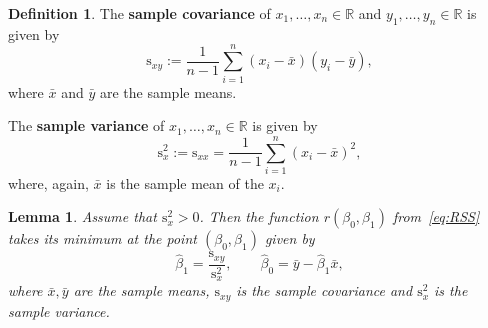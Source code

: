 \documentclass[
  a4paper,
]{article}
\newtheorem{lemma}{Lemma}[section]
\theoremstyle{definition}
\newtheorem{definition}{Definition}[section]
\theoremstyle{definition}
\theoremstyle{definition}
\theoremstyle{definition}
\theoremstyle{remark}
\begin{document}
\begin{definition}
\protect\hypertarget{def:sx}{}\label{def:sx}The \textbf{sample covariance} of \(x_1, \ldots, x_n \in \mathbb{R}\) and
\(y_1, \ldots, y_n\in\mathbb{R}\) is given by
\begin{equation*}
    \mathrm{s}_{xy}
    := \frac{1}{n-1} \sum_{i=1}^n (x_i - \bar x) (y_i - \bar y),
  \end{equation*}
where \(\bar x\) and \(\bar y\) are the sample means.

The \textbf{sample variance} of \(x_1, \ldots, x_n \in \mathbb{R}\) is given by
\begin{equation*}
    \mathrm{s}_{x}^2
    := \mathrm{s}_{xx}
    = \frac{1}{n-1} \sum_{i=1}^n (x_i - \bar x)^2,
  \end{equation*}
where, again, \(\bar x\) is the sample mean of the \(x_i\).
\end{definition}

\begin{lemma}
\protect\hypertarget{lem:simple-LSQ}{}\label{lem:simple-LSQ}Assume that \(\mathrm{s}_x^2 > 0\). Then the function \(r(\beta_0, \beta_1)\)
from~\eqref{eq:RSS} takes its minimum at the point \((\beta_0, \beta_1)\)
given by
\begin{equation*}
    \hat\beta_1 = \frac{\mathrm{s}_{xy}}{\mathrm{s}_x^2},
    \qquad
    \hat\beta_0 = \bar y - \hat \beta_1 \bar x,
  \end{equation*}
where \(\bar x, \bar y\) are the sample means, \(\mathrm{s}_{xy}\) is the
sample covariance and \(\mathrm{s}_x^2\) is the sample variance.
\end{lemma}
\end{document}
